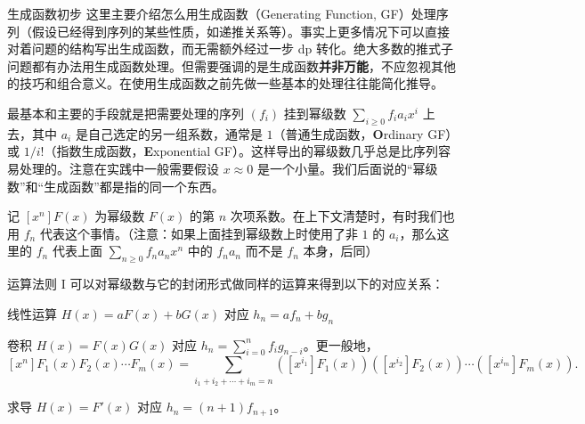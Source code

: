\begin{frame}{生成函数初步}
    这里主要介绍怎么用生成函数（Generating Function, GF）处理序列（假设已经得到序列的某些性质，如递推关系等）。事实上更多情况下可以直接对着问题的结构写出生成函数，而无需额外经过一步 dp 转化。绝大多数的推式子问题都有办法用生成函数处理。但需要强调的是生成函数\textbf{并非万能}，不应忽视其他的技巧和组合意义。在使用生成函数之前先做一些基本的处理往往能简化推导。

    最基本和主要的手段就是把需要处理的序列 $(f_i)$ 挂到幂级数 $\sum_{i\ge 0}f_i a_i x^i$ 上去，其中 $a_i$ 是自己选定的另一组系数，通常是 $1$（普通生成函数，\textbf{O}rdinary GF）或 $1/i!$（指数生成函数，\textbf{E}xponential GF）。这样导出的幂级数几乎总是比序列容易处理的。注意在实践中一般需要假设 $x\approx 0$ 是一个小量。我们后面说的“幂级数”和“生成函数”都是指的同一个东西。

    记 $[x^n]F(x)$ 为幂级数 $F(x)$ 的第 $n$ 次项系数。在上下文清楚时，有时我们也用 $f_n$ 代表这个事情。（注意：如果上面挂到幂级数上时使用了非 $1$ 的 $a_i$，那么这里的 $f_n$ 代表上面 $\sum_{n\ge 0}f_na_nx^n$ 中的 $f_na_n$ 而不是 $f_n$ 本身，后同）
\end{frame}
\begin{frame}{运算法则 I}
    可以对幂级数与它的封闭形式做同样的运算来得到以下的对应关系：

    线性运算 $H(x)=aF(x)+bG(x)$ 对应 $h_n=af_n+bg_n$

    卷积 $H(x)=F(x)G(x)$ 对应 $h_n=\sum_{i=0}^n f_ig_{n-i}$。更一般地，
    $$
    [x^n]F_1(x)F_2(x)\cdots F_m(x)=\sum_{i_1+i_2+\cdots+i_m=n}([x^{i_1}]F_1(x))([x^{i_2}]F_2(x))\cdots ([x^{i_m}]F_m(x)).
    $$

    求导 $H(x)=F'(x)$ 对应 $h_n=(n+1)f_{n+1}$。
\end{frame}
